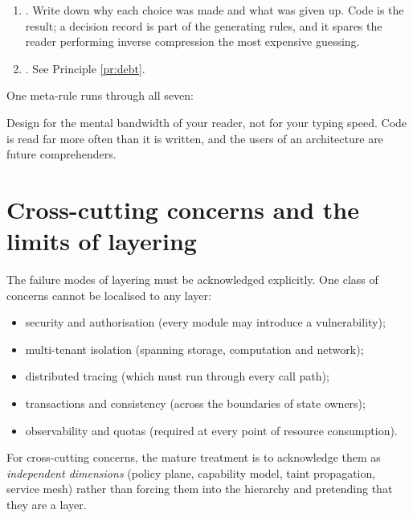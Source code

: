 \begin{enumerate}[label=(D\arabic*)]
      only encoded in a type system, assertions, contract tests and property tests does it
      endure. \emph{Types are architectural documentation enforced by the compiler}. This
      is the confluence of ``designing for comprehensibility'' and ``designing for
      correctness'': an invariant that a machine can check need not be maintained from
      memory by a human or an AI.
\item {}. Write down why each choice was made and what was given up.
      Code is the result; a decision record is part of the generating rules, and it spares
      the reader performing inverse compression the most expensive guessing.
\item {}. See Principle \ref{pr:debt}.
\end{enumerate}

One meta-rule runs through all seven:

\begin{principle}\label{pr:reader}
Design for the mental bandwidth of your reader, not for your typing speed. Code is read far
more often than it is written, and the users of an architecture are future comprehenders.
\end{principle}

\section{Cross-cutting concerns and the limits of layering}\label{sec:crosscutting}

The failure modes of layering must be acknowledged explicitly. One class of concerns cannot
be localised to any layer:

\begin{itemize}
\item security and authorisation (every module may introduce a vulnerability);
\item multi-tenant isolation (spanning storage, computation and network);
\item distributed tracing (which must run through every call path);
\item transactions and consistency (across the boundaries of state owners);
\item observability and quotas (required at every point of resource consumption).
\end{itemize}

\begin{principle}\label{pr:crosscutting}
For cross-cutting concerns, the mature treatment is to acknowledge them as
\emph{independent dimensions} (policy plane, capability model, taint propagation, service
mesh) rather than forcing them into the hierarchy and pretending that they are a layer.
\end{principle}


